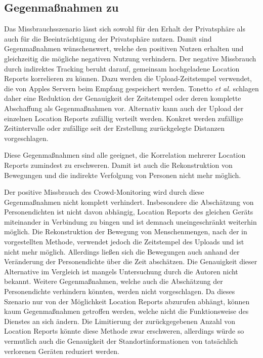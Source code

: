 \subsection{Gegenmaßnahmen zu }

Das Missbrauchsszenario  lässt sich sowohl für den Erhalt der Privatsphäre als auch für die Beeinträchtigung der Privatsphäre nutzen.
Damit sind Gegenmaßnahmen wünschenswert, welche den positiven Nutzen erhalten und gleichzeitig die mögliche negativen Nutzung verhindern.
Der negative Missbrauch durch indirektes Tracking beruht darauf, gemeinsam hochgeladene Location Reports korrelieren zu können.
Dazu werden die Upload-Zeitstempel verwendet, die von Apples Servern beim Empfang gespeichert werden.
Tonetto \textit{et al.} \cite{Tonetto_FindMy} schlagen daher eine Reduktion der Genauigkeit der Zeitstempel oder deren komplette Abschaffung als Gegenmaßnahmen vor.
Alternativ kann auch der Upload der einzelnen Location Reports zufällig verteilt werden.
Konkret werden zufällige Zeitintervalle oder zufällige seit der Erstellung zurückgelegte Distanzen vorgeschlagen.

Diese Gegenmaßnahmen sind alle geeignet, die Korrelation mehrerer Location Reports zumindest zu erschweren.
Damit ist auch die Rekonstruktion von Bewegungen und die indirekte Verfolgung von Personen nicht mehr möglich. 

Der positive Missbrauch des Crowd-Monitoring wird durch diese Gegenmaßnahmen nicht komplett verhindert.
Insbesondere die Abschätzung von Personendichten ist nicht davon abhängig, Location Reports des gleichen Geräts miteinander in Verbindung zu bingen und ist demnach uneingeschränkt weiterhin möglich.
Die Rekonstruktion der Bewegung von Menschenmengen, nach der in \cite{Tonetto_FindMy} vorgestellten Methode, verwendet jedoch die Zeitstempel des Uploads und ist nicht mehr möglich.
Allerdings ließen sich die Bewegungen auch anhand der Veränderung der Personendichte über die Zeit abschätzen.
Die Genauigkeit dieser Alternative im Vergleich ist mangels Untersuchung durch die Autoren nicht bekannt.
Weitere Gegenmaßnahmen, welche auch die Abschätzung der Personendichte verhindern könnten, werden nicht vorgeschlagen.
Da dieses Szenario nur von der Möglichkeit Location Reports abzurufen abhängt, können kaum Gegenmaßnahmen getroffen werden, welche nicht die Funktionsweise des Dienstes an sich ändern.
Die Limitierung der zurückgegebenen Anzahl von Location Reports könnte diese Methode zwar erschweren, allerdings würde so vermutlich auch die Genauigkeit der Standortinformationen von tatsächlich verlorenen Geräten reduziert werden.

